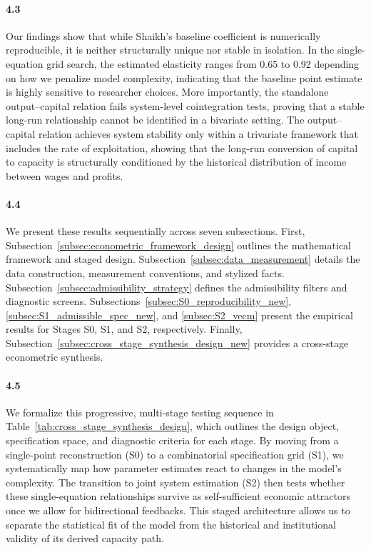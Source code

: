 \paragraph{4.3}
Our findings show that while Shaikh's baseline coefficient is numerically reproducible, it is neither structurally unique nor stable in isolation. In the single-equation grid search, the estimated elasticity ranges from 0.65 to 0.92 depending on how we penalize model complexity, indicating that the baseline point estimate is highly sensitive to researcher choices. More importantly, the standalone output--capital relation fails system-level cointegration tests, proving that a stable long-run relationship cannot be identified in a bivariate setting. The output--capital relation achieves system stability only within a trivariate framework that includes the rate of exploitation, showing that the long-run conversion of capital to capacity is structurally conditioned by the historical distribution of income between wages and profits.

\paragraph{4.4}
We present these results sequentially across seven subsections. First, Subsection~\ref{subsec:econometric_framework_design} outlines the mathematical framework and staged design. Subsection~\ref{subsec:data_measurement} details the data construction, measurement conventions, and stylized facts. Subsection~\ref{subsec:admissibility_strategy} defines the admissibility filters and diagnostic screens. Subsections~\ref{subsec:S0_reproducibility_new}, \ref{subsec:S1_admissible_spec_new}, and \ref{subsec:S2_vecm} present the empirical results for Stages S0, S1, and S2, respectively. Finally, Subsection~\ref{subsec:cross_stage_synthesis_design_new} provides a cross-stage econometric synthesis.

\paragraph{4.5}
We formalize this progressive, multi-stage testing sequence in Table~\ref{tab:cross_stage_synthesis_design}, which outlines the design object, specification space, and diagnostic criteria for each stage. By moving from a single-point reconstruction (S0) to a combinatorial specification grid (S1), we systematically map how parameter estimates react to changes in the model's complexity. The transition to joint system estimation (S2) then tests whether these single-equation relationships survive as self-sufficient economic attractors once we allow for bidirectional feedbacks. This staged architecture allows us to separate the statistical fit of the model from the historical and institutional validity of its derived capacity path.


